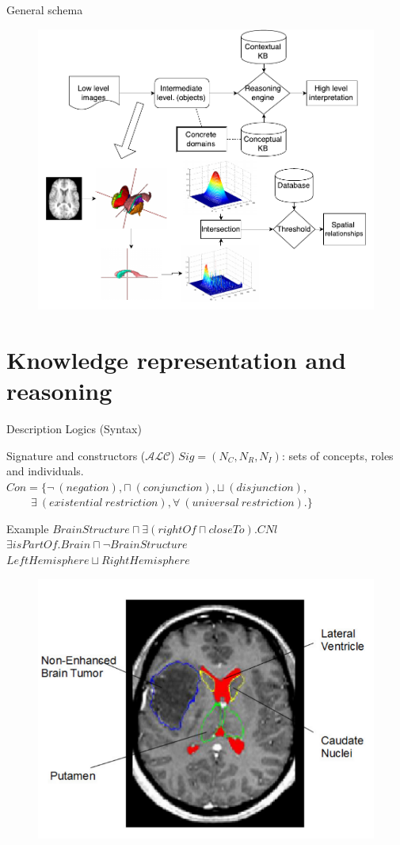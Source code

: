 \documentclass{beamer}
\begin{document}
\begin{frame}{General schema}
	\begin{figure}[t]
	\includegraphics[width=\linewidth,height=0.9\textheight]{images/flowchart_3_crop.pdf}
	\end{figure}
 	\vspace{5cm}
\end{frame}


\section{Knowledge representation and reasoning}
\begin{frame}{Description Logics (Syntax)}
\begin{block}{Signature and constructors ($\mathcal{ALC}$)}
$Sig=(N_C,N_R,N_I)$: sets of concepts, roles and individuals.\\
$Con=\{\neg~(negation),\sqcap~(conjunction),\sqcup~(disjunction),$\\$~~~~~~~~~~\exists~(existential~restriction),\forall~(universal~restriction).\}$
\end{block}

\begin{exampleblock}{Example}
$BrainStructure \sqcap \exists (rightOf \sqcap closeTo). CNl$\\
$\exists isPartOf. Brain \sqcap \neg BrainStructure$\\
$LeftHemisphere\sqcup RightHemisphere$
\end{exampleblock}
	\begin{figure}
	\includegraphics[width=.3\textwidth]{images/cerebrale.png}
	\end{figure}
\end{frame}
\end{document}

